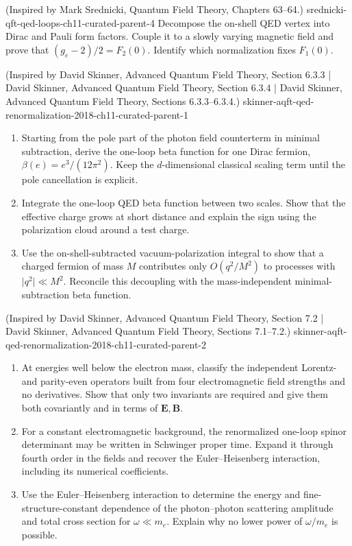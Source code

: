\begin{enumerate}
  {(Inspired by Mark Srednicki, Quantum Field Theory, Chapters 63--64.)}
  {srednicki-qft-qed-loops-ch11-curated-parent-4}
Decompose the on-shell QED vertex into Dirac and Pauli form factors.  Couple
it to a slowly varying magnetic field and prove that
\((g_e-2)/2=F_2(0)\).  Identify which normalization fixes \(F_1(0)\).

  {(Inspired by David Skinner, Advanced Quantum Field Theory, Section 6.3.3 | David Skinner, Advanced Quantum Field Theory, Section 6.3.4 | David Skinner, Advanced Quantum Field Theory, Sections 6.3.3--6.3.4.)}
  {skinner-aqft-qed-renormalization-2018-ch11-curated-parent-1}
\begin{enumerate}
\item
Starting from the pole part of the photon field counterterm in minimal
subtraction, derive the one-loop beta function for one Dirac fermion,
\(\beta(e)=e^3/(12\pi^2)\).  Keep the \(d\)-dimensional classical scaling
term until the pole cancellation is explicit.
\item
Integrate the one-loop QED beta function between two scales.  Show that the
effective charge grows at short distance and explain the sign using the
polarization cloud around a test charge.
\item
Use the on-shell-subtracted vacuum-polarization integral to show that a
charged fermion of mass \(M\) contributes only
\(O(q^2/M^2)\) to processes with \(\lvert q^2\rvert\ll M^2\).  Reconcile
this decoupling with the mass-independent minimal-subtraction beta function.
\end{enumerate}

  {(Inspired by David Skinner, Advanced Quantum Field Theory, Section 7.2 | David Skinner, Advanced Quantum Field Theory, Sections 7.1--7.2.)}
  {skinner-aqft-qed-renormalization-2018-ch11-curated-parent-2}
\begin{enumerate}
\item
At energies well below the electron mass, classify the independent
Lorentz- and parity-even operators built from four electromagnetic field
strengths and no derivatives.  Show that only two invariants are required
and give them both covariantly and in terms of \(\mathbf E,\mathbf B\).
\item
For a constant electromagnetic background, the renormalized one-loop
spinor determinant may be written in Schwinger proper time.  Expand it
through fourth order in the fields and recover the Euler--Heisenberg
interaction, including its numerical coefficients.
\item
Use the Euler--Heisenberg interaction to determine the energy and
fine-structure-constant dependence of the photon--photon scattering
amplitude and total cross section for \(\omega\ll m_e\).  Explain why no
lower power of \(\omega/m_e\) is possible.
\end{enumerate}


\end{enumerate}
